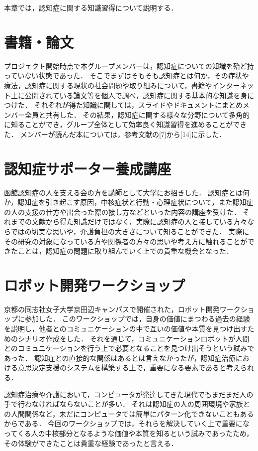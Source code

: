 \documentclass[../report]{subfiles}
\begin{document}
本章では，認知症に関する知識習得について説明する．

\section{書籍・論文}
プロジェクト開始時点で本グループメンバーは，認知症についての知識を殆ど持っていない状態であった．
そこでまずはそもそも認知症とは何か，その症状や療法，認知症に関する現状の社会問題や取り組みについて，書籍やインターネット上に公開されている論文等を個人で調べ，認知症に関する基本的な知識を身につけた．
それぞれが得た知識に関しては，スライドやドキュメントにまとめメンバー全員と共有した．
その結果，認知症に関する様々な分野について多角的に知ることができ，グループ全体として効率良く知識習得を進めることができた．
メンバーが読んだ本については，参考文献の[7]から[14]に示した．

\section{認知症サポーター養成講座}
函館認知症の人を支える会の方を講師として大学にお招きした．
認知症とは何か，認知症を引き起こす原因，中核症状と行動・心理症状について，また認知症の人の支援の仕方や出会った際の接し方などといった内容の講座を受けた．
それまでの文献から得た知識だけではなく，実際に認知症の人と接している方々ならではの切実な思いや，介護負担の大きさについて知ることができた．
実際にその研究の対象になっている方や関係者の方々の思いや考え方に触れることができたことは，認知症の問題に取り組んでいく上での貴重な機会となった．

\section{ロボット開発ワークショップ}
京都の同志社女子大学京田辺キャンパスで開催された，ロボット開発ワークショップに参加した．
このワークショップでは，自身の価値にまつわる過去の経験を説明し，他者とのコミュニケーションの中で互いの価値や本質を見つけ出すためのシナリオ作成をした．
それを通じて，コミュニケーションロボットが人間とのコミュニケーションを行う上で必要となることを見つけ出そうという試みであった．
認知症との直接的な関係はあるとは言えなかったが，認知症治療における意思決定支援のシステムを構築する上で，重要になる要素であると考えられる．

認知症治療や介護において，コンピュータが発達してきた現代でもまだまだ人の手で行わなければならないことが多い．
それは認知症の人の周囲環境や家族との人間関係など，未だにコンピュータでは簡単にパターン化できないこともあるからである．
今回のワークショップでは，それらを解決していく上で重要になってくる人の中核部分となるような価値や本質を知るという試みであったため，その体験ができたことは貴重な経験であったと言える．
\end{document}
